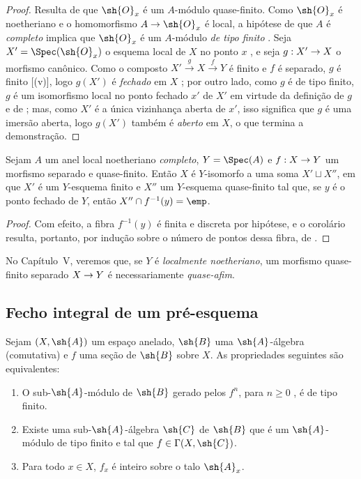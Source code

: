 \documentclass[oneside,10pt]{amsart}
\makeatletter
\renewcommand{\geq}{\geqslant}
\newcommand{\ega@arrow}[2]{\mathchoice{#1}{#2}{#2}{#2}}
\renewcommand{\to}{\ega@arrow{\longrightarrow}{\rightarrow}}
\let\EGAOriginalLabel\label
\renewcommand{\label}[1]{\phantomsection\EGAOriginalLabel{#1}}
\makeatother
\begin{document}
\begin{proof}
Resulta de  que $\sh{O}_x$ é um $A$-módulo quase-finito.
Como $\sh{O}_x$ é noetheriano  e o homomorfismo $A\to\sh{O}_x$ é local, a hipótese de que $A$ é \emph{completo} implica que $\sh{O}_x$ é um $A$-módulo \emph{de tipo finito} .
Seja $X'=\Spec(\sh{O}_x)$ o esquema local de $X$ no ponto $x$ , e seja $g:X'\to X$ o morfismo canônico.
Como o composto $X'\xrightarrow{g}X\xrightarrow{f}Y$ é finito  e $f$ é separado, $g$ é finito [(v)], logo $g(X')$ é \emph{fechado} em $X$ ;
por outro lado, como $g$ é de tipo finito, $g$ é um isomorfismo local no ponto fechado $x'$ de $X'$ em virtude da definição de $g$ e de ;
mas, como $X'$ é a única vizinhança aberta de $x'$, isso significa que $g$ é uma imersão aberta, logo $g(X')$ também é \emph{aberto} em $X$, o que termina a demonstração.
\end{proof}

\begin{corollary}[6.2.6]
\label{II.6.2.6}
Sejam $A$ um anel local noetheriano \emph{completo}, $Y=\Spec(A)$ e $f:X\to Y$ um morfismo separado e quase-finito.
Então $X$ é $Y$-isomorfo a uma soma $X'\sqcup X''$, em que $X'$ é um $Y$-esquema finito e $X''$ um $Y$-esquema quase-finito tal que, se $y$ é o ponto fechado de $Y$, então $X''\cap f^{-1}(y)=\emp$.
\end{corollary}

\begin{proof}
Com efeito, a fibra $f^{-1}(y)$ é finita e discreta por hipótese, e o corolário resulta, portanto, por indução sobre o número de pontos dessa fibra, de .
\end{proof}

\begin{remark}[6.2.7]
\label{II.6.2.7}
No Capítulo~V, veremos que, se $Y$ é \emph{localmente noetheriano}, um morfismo quase-finito separado $X\to Y$ é necessariamente \emph{quase-afim}.
\end{remark}

\subsection{Fecho integral de um pré-esquema}
\label{subsection:II.6.3}

\begin{proposition}[6.3.1]
\label{II.6.3.1}
Sejam $(X,\sh{A})$ um espaço anelado, $\sh{B}$ uma $\sh{A}$-álgebra (comutativa) e $f$ uma seção de $\sh{B}$ sobre $X$.
As propriedades seguintes são equivalentes:
\begin{enumerate}
  \item[\rm{(a)}] O sub-$\sh{A}$-módulo de $\sh{B}$ gerado pelos $f^n$, para $n\geq0$ , é de tipo finito.
  \item[\rm{(b)}] Existe uma sub-$\sh{A}$-álgebra $\sh{C}$ de $\sh{B}$ que é um $\sh{A}$-módulo de tipo finito e tal que $f\in\Gamma(X,\sh{C})$.
  \item[\rm{(c)}] Para todo $x\in X$, $f_x$ é inteiro sobre o talo $\sh{A}_x$.
\end{enumerate}
\end{proposition}
\end{document}
